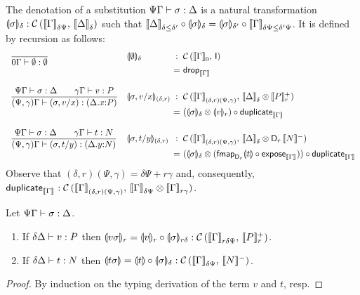 \documentclass[acmsmall,review,anonymous]{acmart}\settopmatter{printfolios=true,printccs=false,printacmref=false}
\begin{document}
The denotation of a substitution $\SubstTy \Psi \Gamma \sigma \Delta$
is a natural transformation
$\denv \sigma \delta : \Hom {\Den \Gamma {\delta\Psi}} {\Den \Delta
  \delta}$
such that
$
\Den \Delta {\delta \leq \delta'}
\comp
\denv \sigma \delta
=
\denv \sigma {\delta'}
\comp
\Den \Gamma {\delta\Psi \leq \delta'\Psi}
$.
It is defined by recursion as follows:
\[
\begin{array}{ll@{~}c@{~}l@{~}c@{~}l}
\ru{
    }{\SubstTy {0} \Gamma \sempty \cempty}
& \denv \sempty \delta
& : & \Hom {\Den\Gamma 0} \I
\\ &
& = & \tdrop[\den\Gamma]
\\[3ex]
\ru{\SubstTy \Psi \Gamma \sigma \Delta \qquad
      \qValTy \gamma \Gamma v P
    }{\pSubstTy {\Psi,\gamma} \Gamma {\sext \sigma x v} {\ext \Delta x P}}
& \denvp {\sext \sigma x v} {\delta,r}
& : & \Hom  {\Den\Gamma{(\delta,r)(\Psi,\gamma)}} {\Den \Delta \delta \otimes \Denp P r}
\\ &
& = & (\denv \sigma \delta \otimes \denv v r)
\comp \duplicate[\den\Gamma]
\\[3ex]
\ru{\SubstTy \Psi \Gamma \sigma \Delta \qquad
      \qCompTy \gamma \Gamma t N
    }{\pSubstTy {\Psi,\gamma} \Gamma {\sext \sigma y t} {\ext \Delta y N}}
& \denvp {\sext \sigma y t} {\delta,r}
& : & \Hom  {\Den\Gamma{(\delta,r)(\Psi,\gamma)}} {\Den \Delta \delta \otimes \D[r]\,\denn N}
\\ &
& = & (\denv \sigma \delta \otimes (\fmapt[{\D[r]}]{\dent t} \comp \expose[{\den\Gamma}]))
\comp \duplicate[\den\Gamma]
\end{array}
\]
Observe that $(\delta,r)(\Psi,\gamma) = \delta\Psi + r\gamma$ and,
consequently,
$\duplicate[\den\Gamma] : \Hom {\Den\Gamma{(\delta,r)(\Psi,\gamma)}}
{\Den\Gamma{\delta\Psi} \otimes \Den\Gamma{r\gamma}}$.
\begin{theorem}
  Let $\SubstTy \Psi \Gamma \sigma \Delta$.
  \begin{enumerate}
  \item If $\qValTy \delta \Delta v P$ then
     $\denv{v\sigma}r = \denv v {r} \comp \denv \sigma {r\delta}
      : \Hom {\Den{\Gamma}{r\delta\Psi}} {\Denp P r}$.
  \item If $\qCompTy \delta \Delta t N$ then
     $\dent{t\sigma} = \dent t \comp \denv \sigma \delta
      : \Hom {\Den\Gamma{\delta\Psi}} {\denn N}$.
  \end{enumerate}
\end{theorem}
\begin{proof}
  By induction on the typing derivation of the term $v$ and $t$, resp.
\end{proof}
\end{document}
